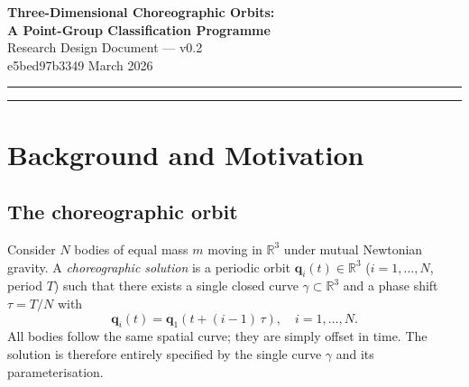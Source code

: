 \documentclass[12pt, a4paper]{article}
\theoremstyle{definition}
\newcommand{\R}{\mathbb{R}}
\newcommand{\q}{\mathbf{q}}
\begin{document}
\begin{center}
  {\LARGE \textbf{Three-Dimensional Choreographic Orbits:\\[4pt]
  A Point-Group Classification Programme}}\\[1.6em]
  {\large \textcolor{muted}{Research Design Document — v0.2}}\\[0.6em]
  {\normalsize \textcolor{muted}{e5bed97b3349 \quad\textbullet\quad March 2026}}
\end{center}

\vspace{1.2em}
\noindent\rule{\textwidth}{0.4pt}
\vspace{0.4em}

\begin{abstract}
\noindent
We propose a systematic programme to discover, classify, and characterise
three-dimensional equal-mass choreographic solutions to the Newtonian
$N$-body problem. A \emph{choreographic orbit} is a periodic solution in
which all $N$ bodies traverse a single closed curve, equally spaced in
phase. While the two-dimensional case has been surveyed extensively — most
notably by Sim\'o (2002) — fully three-dimensional choreographies remain
largely unexplored. Our programme organises the search space by the
three-dimensional point-group symmetry of the orbit, imports the
classification machinery of molecular symmetry into gravitational dynamics,
and characterises each discovered orbit by the knot type of its spacetime
trace. We expect the resulting catalogue to reveal a rich correspondence
between symmetry class, knot invariant, and action value, and to draw
explicit connections to the emerging literature on mechanically synthesised
molecular knots.
\end{abstract}

\noindent\rule{\textwidth}{0.4pt}
\vspace{1em}

\section{Background and Motivation}

\subsection{The choreographic orbit}

Consider $N$ bodies of equal mass $m$ moving in $\R^3$ under mutual
Newtonian gravity. A \emph{choreographic solution} is a periodic orbit
$\q_i(t) \in \R^3$ ($i = 1, \ldots, N$, period $T$) such that there exists
a single closed curve $\gamma \subset \R^3$ and a phase shift $\tau = T/N$
with
\[
  \q_i(t) = \q_1\!\left(t + (i-1)\,\tau\right), \quad i = 1, \ldots, N.
\]
All bodies follow the same spatial curve; they are simply offset in time.
The solution is therefore entirely specified by the single curve
$\gamma$ and its parameterisation.
\end{document}
